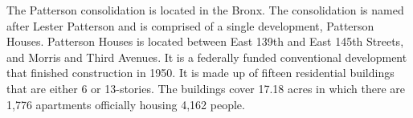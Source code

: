 The Patterson consolidation is located in the Bronx. The consolidation is named after Lester Patterson and is comprised of a single development, Patterson Houses. Patterson Houses is located between East 139th and East 145th Streets, and Morris and Third Avenues. It is a federally funded conventional development that finished construction in 1950. It is made up of fifteen residential buildings that are either 6 or 13-stories. The buildings cover 17.18 acres in which there are 1,776 apartments officially housing 4,162 people.